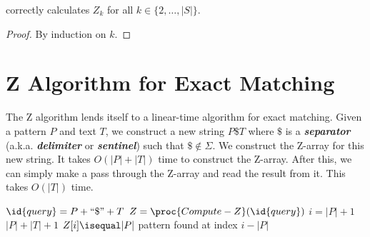 \begin{corollary}
     correctly calculates $Z_k$ for all $k \in \{2,\ldots,|S|\}$.
\end{corollary}

\begin{proof}
    By induction on $k$.
\end{proof}

\section{Z Algorithm for Exact Matching}

The Z algorithm lends itself to a linear-time algorithm for exact matching. Given a pattern $P$ and text $T$, we construct a new string $P \$ T$ where $\$$ is a \textit{\textbf{separator}} (a.k.a. \textit{\textbf{delimiter}} or \textit{\textbf{sentinel}}) such that $\$ \not\in \Sigma$. We construct the Z-array for this new string. It takes $O(|P|+|T|)$ time to construct the Z-array. After this, we can simply make a pass through the Z-array and read the result from it. This takes $O(|T|)$ time.

\begin{codebox}
    \li $\id{query} = P + ``\$" + T$
    \li $Z = \proc{Compute-Z}(\id{query})$
    \li \For $i = |P|+1$ \To $|P|+|T|+1$ \Do
        \li \If $Z[i] \isequal |P|$ \Then
            \li pattern found at index $i - |P|$ 
\end{codebox}